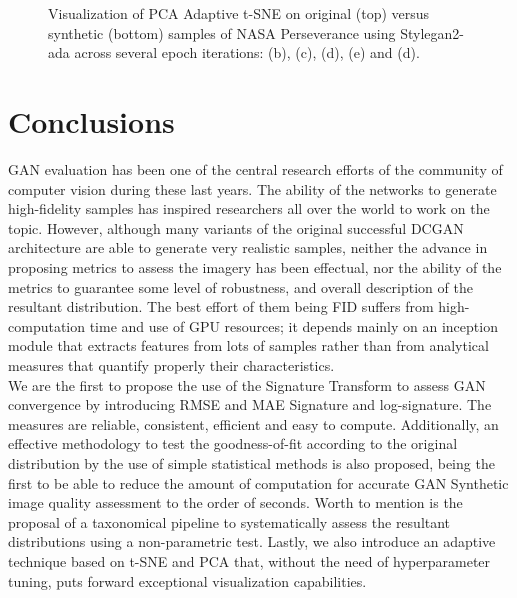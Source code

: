 \documentclass[lettersize,journal]{IEEEtran}
\begin{document}
\begin{figure}[ht]
\centering
{}\\
\\
\caption{Visualization of PCA Adaptive t-SNE on original (top) versus synthetic (bottom) samples of NASA Perseverance using Stylegan2-ada across several epoch iterations:  (b),  (c),  (d),  (e) and  (d).}
\label{fge:b_3_decurto_and_dezarza}
\end{figure}

\section{Conclusions}
\label{sn:conclusions}

GAN evaluation has been one of the central research efforts of the community of computer vision during these last years. The ability of the networks to generate high-fidelity samples has inspired researchers all over the world to work on the topic. However, although many variants of the original successful DCGAN architecture are able to generate very realistic samples, neither the advance in proposing metrics to assess the imagery has been effectual, nor the ability of the metrics to guarantee some level of robustness, and overall description of the resultant distribution. The best effort of them being FID suffers from high-computation time and use of GPU resources; it depends mainly on an inception module that extracts features from lots of samples rather than from analytical measures that quantify properly their characteristics.  
\\

We are the first to propose the use of the Signature Transform to assess GAN convergence by introducing RMSE and MAE Signature and log-signature. The measures are reliable, consistent, efficient and easy to compute. Additionally, an effective methodology to test the goodness-of-fit according to the original distribution by the use of simple statistical methods is also proposed, being the first to be able to reduce the amount of computation for accurate GAN Synthetic image quality assessment to the order of seconds. Worth to mention is the proposal of a taxonomical pipeline to systematically assess the resultant distributions using a non-parametric test. Lastly, we also introduce an adaptive technique based on t-SNE and PCA that, without the need of hyperparameter tuning, puts forward exceptional visualization capabilities.
\\
\end{document}
